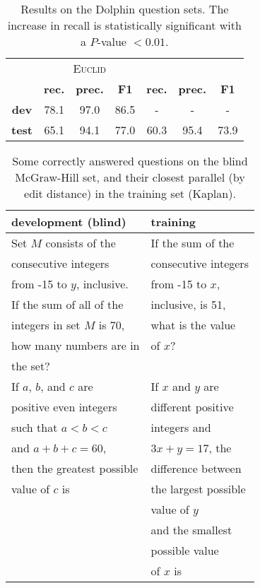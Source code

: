 \documentclass[11pt,letterpaper]{article}
\begin{document}
\begin{table}[tb]
\begin{center}
\begin{tabular}{|c||c|c|c||c|c|c|}
\hline
& \multicolumn{3}{|c||}{\textsc{Euclid}} & \multicolumn{3}{|c|}{\cite{Shi2015AutomaticallySN}} \\
\cline{2-7}
& \textbf{rec.} & \textbf{prec.} & \textbf{F1} & \textbf{rec.} & \textbf{prec.} & \textbf{F1} \\
\hline
\textbf{dev} & 78.1 & 97.0 & 86.5 & - & - & - \\
\textbf{test} & 65.1 & 94.1 & 77.0 & 60.3 & 95.4 & 73.9 \\
\hline
\end{tabular}
\end{center}
\caption{\label{tab:results2} Results on the Dolphin question sets. The increase in recall is statistically significant with a $P$-value $< 0.01$.}
\end{table}

\begin{table}[tb]
\begin{center}
\begin{tabular}{|l|l|}
\hline
\textbf{development (blind)} & \textbf{training} \\
\hline
Set $M$ consists of the & If the sum of the \\
consecutive integers & consecutive integers \\
from -15 to $y$, inclusive. & from -15 to $x$, \\
If the sum of all of the & inclusive, is 51,  \\
integers in set $M$ is 70, & what is the value \\
how many numbers are in & of $x$? \\
the set? & \\
\hline
If $a$, $b$, and $c$ are & If $x$ and $y$ are \\
positive even integers & different positive \\
such that $a < b < c$ & integers and \\
and $a + b + c = 60$, & \(3x + y = 17\), the \\
then the greatest possible & difference between \\
value of $c$ is & the largest possible \\
& value of $y$ \\
& and the smallest \\
& possible value \\
& of $x$ is \\
\hline
\end{tabular}
\end{center}
\caption{\label{tab:correctanswers} Some correctly answered questions on the blind McGraw-Hill set, and their closest parallel (by edit distance) in the training set (Kaplan).}
\end{table}
\end{document}
